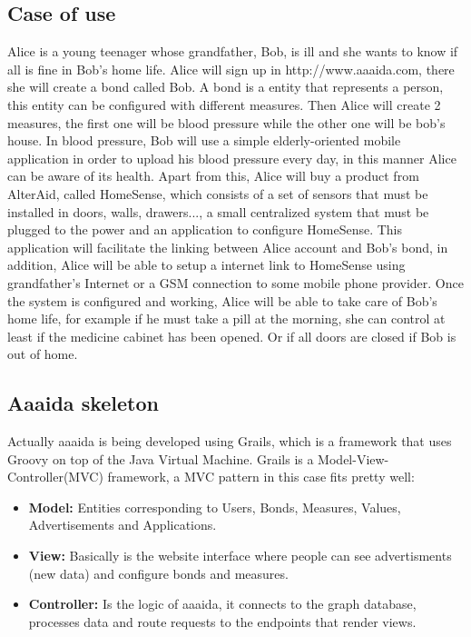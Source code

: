 \subsection{Case of use}\label{SS:Case-Of-Use}
Alice is a young teenager whose grandfather, Bob, is ill and she wants to know if all is fine in Bob's home life. Alice will sign up in http://www.aaaida.com, there she will create a bond called Bob. A bond is a entity that represents a person, this entity can be configured with different measures. Then Alice will create 2 measures, the first one will be blood pressure while the other one will be bob's house.
In blood pressure, Bob will use a simple elderly-oriented mobile application in order to upload his blood pressure every day, in this manner Alice can be aware of its health.
Apart from this, Alice will buy a product from AlterAid, called HomeSense, which consists of a set of sensors that must be installed in doors, walls, drawers..., a small centralized system that must be plugged to the power and an application to configure HomeSense.
This application will facilitate the linking between Alice account and Bob's bond, in addition, Alice will be able to setup a internet link to HomeSense using grandfather's Internet or a GSM connection to some mobile phone provider.
Once the system is configured and working, Alice will be able to take care of Bob's home life, for example if he must take a pill at the morning, she can control at least if the medicine cabinet has been opened. Or if all doors are closed if Bob is out of home.

\subsection{Aaaida skeleton}\label{SS:Aaaida-Skeleton}
Actually aaaida is being developed using Grails, which is a framework that uses Groovy on top of the Java Virtual Machine.
Grails is a Model-View-Controller(MVC) framework, a MVC pattern in this case fits pretty well:
\begin{itemize}
\item{\textbf{Model:} Entities corresponding to Users, Bonds, Measures, Values, Advertisements and Applications.}
\item{\textbf{View:} Basically is the website interface where people can see advertisments (new data) and configure bonds and measures.}
\item{\textbf{Controller:} Is the logic of aaaida, it connects to the graph database, processes data and route requests to the endpoints that render views.}
\end{itemize}

